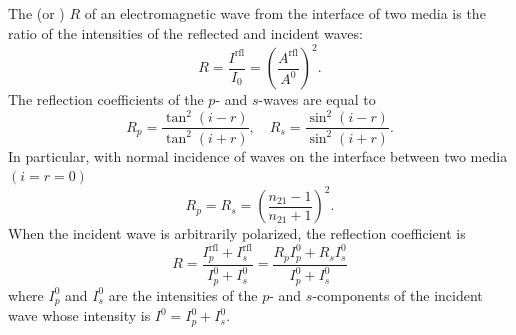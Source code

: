 \subsection{}\label{31.5.6} The  (or ) $R$ of an electromagnetic wave from the interface of two media is the ratio of the intensities  of the reflected and incident waves:
\begin{equation*}%
R = \frac{I^{\text{rfl}}}{I_{0}} = \left( \frac{A^{\text{rfl}}}{A^{0}}\right)^{2}.
\end{equation*}
The reflection coefficients of the $p$- and $s$-waves are equal to
\begin{equation*}%
R_{p} = \frac{\tan^{2}(i -r)}{\tan^{2}(i +r)}, \quad R_{s} = \frac{\sin^{2}(i -r)}{\sin^{2}(i +r)}.
\end{equation*}
In particular, with normal incidence of waves on the interface
between two media $(i = r = 0)$
\begin{equation*}%
R_{p} = R_{s} = \left( \frac{n_{21} -1 }{n_{21} + 1} \right)^{2}.
\end{equation*}
When the incident wave is arbitrarily polarized, the reflection
coefficient is
\begin{equation*}%
R = \frac{I_{p}^{\text{rfl}} + I_{s}^{\text{rfl}}}{I_{p}^{0} + I_{s}^{0}} = \frac{R_{p} I_{p}^{0} + R_{s} I_{s}^{0}}{I_{p}^{0} + I_{s}^{0}}
\end{equation*}
where $I_{p}^{0}$ and $I_{s}^{0}$ are the intensities of the $p$- and $s$-components of the incident wave whose intensity is $I^{0} = I_{p}^{0} + I_{s}^{0}$.

